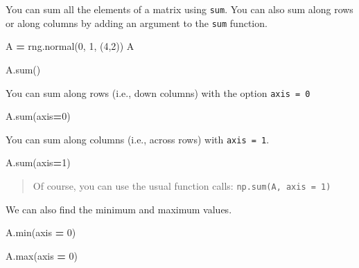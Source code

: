 \documentclass[
  letterpaper,
]{scrbook}
\newenvironment{Shaded}{\begin{snugshade}}{\end{snugshade}}
\newcommand{\BuiltInTok}[1]{#1}
\newcommand{\DecValTok}[1]{\textcolor[rgb]{0.00,0.00,0.81}{#1}}
\newcommand{\NormalTok}[1]{#1}
\newcommand{\OperatorTok}[1]{\textcolor[rgb]{0.81,0.36,0.00}{\textbf{#1}}}
\begin{document}
You can sum all the elements of a matrix using \texttt{sum}. You can also sum along rows or along columns by adding an argument to the \texttt{sum} function.

\begin{Shaded}
\begin{Highlighting}[]
\NormalTok{A }\OperatorTok{=}\NormalTok{ rng.normal(}\DecValTok{0}\NormalTok{, }\DecValTok{1}\NormalTok{, (}\DecValTok{4}\NormalTok{,}\DecValTok{2}\NormalTok{))}
\NormalTok{A}
\end{Highlighting}
\end{Shaded}

\begin{Shaded}
\begin{Highlighting}[]
\NormalTok{A.}\BuiltInTok{sum}\NormalTok{()}
\end{Highlighting}
\end{Shaded}

You can sum along rows (i.e., down columns) with the option \texttt{axis\ =\ 0}

\begin{Shaded}
\begin{Highlighting}[]
\NormalTok{A.}\BuiltInTok{sum}\NormalTok{(axis}\OperatorTok{=}\DecValTok{0}\NormalTok{)}
\end{Highlighting}
\end{Shaded}

You can sum along columns (i.e., across rows) with \texttt{axis\ =\ 1}.

\begin{Shaded}
\begin{Highlighting}[]
\NormalTok{A.}\BuiltInTok{sum}\NormalTok{(axis}\OperatorTok{=}\DecValTok{1}\NormalTok{)}
\end{Highlighting}
\end{Shaded}

\begin{quote}
Of course, you can use the usual function calls: \texttt{np.sum(A,\ axis\ =\ 1)}
\end{quote}

We can also find the minimum and maximum values.

\begin{Shaded}
\begin{Highlighting}[]
\NormalTok{A.}\BuiltInTok{min}\NormalTok{(axis }\OperatorTok{=} \DecValTok{0}\NormalTok{)}
\end{Highlighting}
\end{Shaded}

\begin{Shaded}
\begin{Highlighting}[]
\NormalTok{A.}\BuiltInTok{max}\NormalTok{(axis }\OperatorTok{=} \DecValTok{0}\NormalTok{)}
\end{Highlighting}
\end{Shaded}
\end{document}
